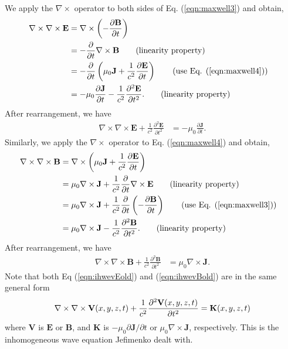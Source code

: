 \documentclass[11pt]{article}              %
\begin{document}
We apply the $\nabla\times$ operator to both sides of Eq. (\ref{eqn:maxwell3}) and obtain,
\begin{align}
    \nabla\times\nabla\times{\mathbf E}&=\nabla\times\left(-\frac{\partial {\mathbf B}}{\partial t}\right)&\notag\\
    &=-\frac{\partial }{\partial t}\nabla\times{\mathbf B}\tag{linearity property}\\
    &=-\frac{\partial}{\partial t}\left(\mu_0{\mathbf J}+\frac{1}{c^2}\frac{\partial{\mathbf E}}{\partial t}\right)\tag{use Eq. (\ref{eqn:maxwell4})}\\
    &=-\mu_0\frac{\partial{\mathbf J}}{\partial t}-\frac{1}{c^2}\frac{\partial^2{\mathbf E}}{\partial t^2}.\tag{linearity property}
\end{align}
After rearrangement, we have
\begin{align}
    \nabla\times\nabla\times{\mathbf E}+\frac{1}{c^2}\frac{\partial^2{\mathbf E}}{\partial t^2}&=-\mu_0\frac{\partial {\mathbf J}}{\partial t}.\label{eqn:ihwevEold}
\end{align}
Similarly, we apply the $\nabla\times$ operator to Eq. (\ref{eqn:maxwell4}) and obtain,
\begin{align}
    \nabla\times\nabla\times{\mathbf B}&=\nabla\times \left(\mu_0{\mathbf J}+\frac{1}{c^2}\frac{\partial {\mathbf E}}{\partial t}\right)&\notag\\
    &=\mu_0\nabla\times {\mathbf J}+\frac{1}{c^2}\frac{\partial }{\partial t}\nabla\times{\mathbf E}\tag{linearity property}\\
    &=\mu_0\nabla\times {\mathbf J}+\frac{1}{c^2}\frac{\partial}{\partial t}\left(-\frac{\partial{\mathbf B}}{\partial t}\right)\tag{use Eq. (\ref{eqn:maxwell3})}\\
    &=\mu_0\nabla\times {\mathbf J}-\frac{1}{c^2}\frac{\partial^2{\mathbf B}}{\partial t^2}.\tag{linearity property}\
\end{align}
After rearrangement, we have
\begin{align}
    \nabla\times\nabla\times{\mathbf B}+\frac{1}{c^2}\frac{\partial^2{\mathbf B}}{\partial t^2}&=\mu_0\nabla\times {\mathbf J}.\label{eqn:ihwevBold}
\end{align}
Note that both Eq (\ref{eqn:ihwevEold}) and (\ref{eqn:ihwevBold}) are in the same general form 
\begin{align}
	\nabla\times\nabla\times {\mathbf V}(x,y,z,t) +\frac{1}{c^2}\frac{\partial^2 {\mathbf V}(x,y,z,t)}{\partial t^2}={\mathbf K}(x,y,z,t)\notag
\end{align}
where ${\mathbf V}$ is $\mathbf E$ or $\mathbf B$, and ${\mathbf K}$ is $-\mu_0{\partial {\mathbf J}}/{\partial t}$ or $\mu_0\nabla\times {\mathbf J}$, respectively. This is the inhomogeneous wave equation Jefimenko dealt with.
\end{document}
